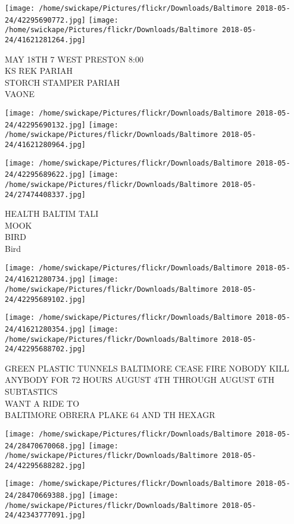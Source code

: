 \documentclass[10pt,letterpaper]{article}
\begin{document}
\texttt{[image: /home/swickape/Pictures/flickr/Downloads/Baltimore 2018-05-24/42295690772.jpg]}
\texttt{[image: /home/swickape/Pictures/flickr/Downloads/Baltimore 2018-05-24/41621281264.jpg]}

MAY 18TH 7 WEST PRESTON 8:00\\
KS REK PARIAH\\
STORCH STAMPER PARIAH\\
VAONE\\
\pagebreak

\texttt{[image: /home/swickape/Pictures/flickr/Downloads/Baltimore 2018-05-24/42295690132.jpg]}
\texttt{[image: /home/swickape/Pictures/flickr/Downloads/Baltimore 2018-05-24/41621280964.jpg]}

\texttt{[image: /home/swickape/Pictures/flickr/Downloads/Baltimore 2018-05-24/42295689622.jpg]}
\texttt{[image: /home/swickape/Pictures/flickr/Downloads/Baltimore 2018-05-24/27474408337.jpg]}

HEALTH BALTIM TALI\\
MOOK\\
BIRD\\
Bird\\
\pagebreak

\texttt{[image: /home/swickape/Pictures/flickr/Downloads/Baltimore 2018-05-24/41621280734.jpg]}
\texttt{[image: /home/swickape/Pictures/flickr/Downloads/Baltimore 2018-05-24/42295689102.jpg]}

\texttt{[image: /home/swickape/Pictures/flickr/Downloads/Baltimore 2018-05-24/41621280354.jpg]}
\texttt{[image: /home/swickape/Pictures/flickr/Downloads/Baltimore 2018-05-24/42295688702.jpg]}

GREEN PLASTIC TUNNELS BALTIMORE CEASE FIRE NOBODY KILL ANYBODY FOR 72 HOURS AUGUST 4TH THROUGH AUGUST 6TH\\
SUBTASTICS\\
WANT A RIDE TO\\
BALTIMORE OBRERA PLAKE 64 AND TH HEXAGR\\
\pagebreak

\texttt{[image: /home/swickape/Pictures/flickr/Downloads/Baltimore 2018-05-24/28470670068.jpg]}
\texttt{[image: /home/swickape/Pictures/flickr/Downloads/Baltimore 2018-05-24/42295688282.jpg]}

\texttt{[image: /home/swickape/Pictures/flickr/Downloads/Baltimore 2018-05-24/28470669388.jpg]}
\texttt{[image: /home/swickape/Pictures/flickr/Downloads/Baltimore 2018-05-24/42343777091.jpg]}
\end{document}
